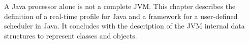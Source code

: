 A Java processor alone is not a complete JVM. This chapter describes
the definition of a real-time profile for Java and a framework for a
user-defined scheduler in Java. It concludes with the description of
the JVM internal data structures to represent classes and objects.

